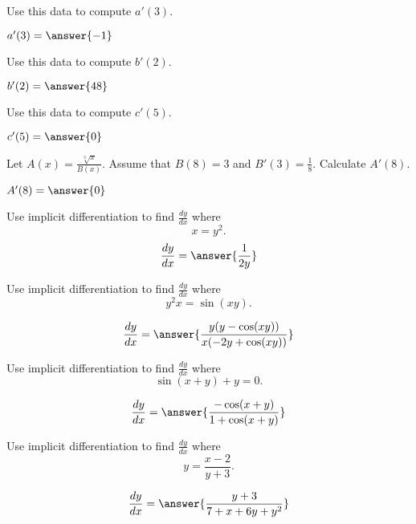 \documentclass[handout]{ximera}
\begin{document}
\begin{exercise}
Use this data to compute $a'(3)$.

	$a'(3) = \answer{-1}$

\end{exercise}


\begin{exercise}
Use this data to compute $b'(2)$.

	$b'(2) = \answer{48}$

\end{exercise}


\begin{exercise}
Use this data to compute $c'(5)$.

	$c'(5) = \answer{0}$

\end{exercise}

\begin{exercise}
Let $A(x) = \frac{\sqrt[3]{x}}{B(x)}$.  Assume that $B(8) = 3$ and $B'(3) = \frac{1}{8}$.  Calculate $A'(8)$.

	$A'(8) = \answer{0}$


\end{exercise}

\begin{exercise}
Use implicit differentiation to find $\frac{dy}{dx}$ where
\[
x = y^2.
\]
\[
\frac{dy}{dx} = \answer{\frac{1}{2y}}
\]

\end{exercise}

\begin{exercise}
Use implicit differentiation to find $\frac{dy}{dx}$ where
\[
y^2x = \sin(xy).
\]

\[
\frac{dy}{dx} = \answer{\frac{y(y-\cos(xy))}{x(-2y+\cos(xy))}}
\]

\end{exercise}

\begin{exercise}
Use implicit differentiation to find $\frac{dy}{dx}$ where
\[
\sin(x+y)+y = 0.
\]
\begin{prompt}
\[
\frac{dy}{dx} = \answer{\frac{-\cos(x+y)}{1+\cos(x+y)}}
\]
\end{prompt}
\end{exercise}

\begin{exercise}
Use implicit differentiation to find $\frac{dy}{dx}$ where
\[
y = \frac{x-2}{y+3}.
\]

\[
\frac{dy}{dx} = \answer{\frac{y+3}{7+x+6y+y^2}}
\]

\end{exercise}
\end{document}
